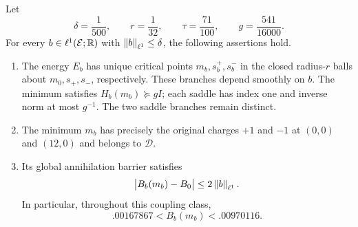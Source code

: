 \begin{theorem}
\label{thm:robustness}
Let
\[
 \delta=\frac1{500},\qquad r=\frac1{32},\qquad
 \tau=\frac{71}{100},\qquad g=\frac{541}{16000}.
\]
For every $b\in\ell^1(\mathcal E;\mathbb R)$ with $\left\lVert b\right\rVert_{\ell^1}\le\delta$,
the following assertions hold.
\begin{enumerate}
\item The energy $E_b$ has unique critical points $m_b,s_b^+,s_b^-$ in
the closed radius-$r$ balls about $m_0,s_+,s_-$, respectively.
These branches depend smoothly on $b$. The minimum satisfies
$H_b(m_b)\succeq gI$; each saddle has index one and inverse norm at most
$g^{-1}$. The two saddle branches remain distinct.
\item The minimum $m_b$ has precisely the original charges $+1$ and $-1$
at $(0,0)$ and $(12,0)$ and belongs to $\mathcal D$.
\item Its global annihilation barrier satisfies
\begin{equation}
 \label{eq:robust-barrier}
 \big|B_b(m_b)-B_0\big|\le2\left\lVert b\right\rVert_{\ell^1}.
\end{equation}
In particular, throughout this coupling class,
\begin{equation}
 \label{eq:robust-barrier-numeric}
 .00167867<B_b(m_b)<.00970116.
\end{equation}
\end{enumerate}
\end{theorem}

